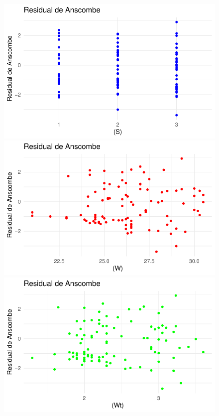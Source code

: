 \documentclass[
  letterpaper,
  DIV=11,
  numbers=noendperiod]{scrartcl}
\begin{document}
\begin{figure}

\begin{minipage}{0.50\linewidth}
\includegraphics{Modelos_files/figure-pdf/unnamed-chunk-30-1.pdf}\end{minipage}%
%
\begin{minipage}{0.50\linewidth}
\includegraphics{Modelos_files/figure-pdf/unnamed-chunk-30-2.pdf}\end{minipage}%
\newline
\begin{minipage}{0.50\linewidth}
\includegraphics{Modelos_files/figure-pdf/unnamed-chunk-30-3.pdf}\end{minipage}%

\end{figure}
\end{document}
